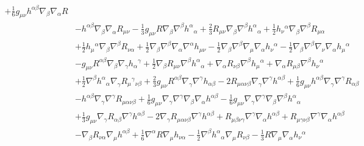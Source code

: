 \documentclass[10pt,letterpaper]{article}
\begin{document}
\begin{align}
 + \tfrac{1}{6} g_{\mu \nu} h^{\alpha \beta} \nabla_{\beta}\nabla_{\alpha}R\nonumber\\
& -  h^{\alpha \beta} \nabla_{\beta}\nabla_{\alpha}R_{\mu \nu}
 -  \tfrac{1}{3} g_{\mu \nu} R \nabla_{\beta}\nabla^{\beta}h^{\alpha}{}_{\alpha}
 + \tfrac{2}{3} R_{\mu \nu} \nabla_{\beta}\nabla^{\beta}h^{\alpha}{}_{\alpha}
 + \tfrac{1}{2} h_{\nu}{}^{\alpha} \nabla_{\beta}\nabla^{\beta}R_{\mu \alpha}\nonumber\\
& + \tfrac{1}{2} h_{\mu}{}^{\alpha} \nabla_{\beta}\nabla^{\beta}R_{\nu \alpha}
 + \tfrac{1}{2} \nabla_{\beta}\nabla^{\beta}\nabla_{\alpha}\nabla^{\alpha}h_{\mu \nu}
 -  \tfrac{1}{2} \nabla_{\beta}\nabla^{\beta}\nabla_{\mu}\nabla_{\alpha}h_{\nu}{}^{\alpha}
 -  \tfrac{1}{2} \nabla_{\beta}\nabla^{\beta}\nabla_{\nu}\nabla_{\alpha}h_{\mu}{}^{\alpha}\nonumber\\
& -  g_{\mu \nu} R^{\alpha \beta} \nabla_{\beta}\nabla_{\gamma}h_{\alpha}{}^{\gamma}
 + \tfrac{1}{2} \nabla_{\beta}R_{\mu \nu} \nabla^{\beta}h^{\alpha}{}_{\alpha}
 + \nabla_{\alpha}R_{\nu \beta} \nabla^{\beta}h_{\mu}{}^{\alpha}
 + \nabla_{\alpha}R_{\mu \beta} \nabla^{\beta}h_{\nu}{}^{\alpha}\nonumber\\
& + \tfrac{1}{2} \nabla^{\beta}h^{\alpha}{}_{\alpha} \nabla_{\gamma}R_{\mu}{}^{\gamma}{}_{\nu \beta}
 + \tfrac{2}{3} g_{\mu \nu} R^{\alpha \beta} \nabla_{\gamma}\nabla^{\gamma}h_{\alpha \beta}
 - 2 R_{\mu \alpha \nu \beta} \nabla_{\gamma}\nabla^{\gamma}h^{\alpha \beta}
 + \tfrac{1}{6} g_{\mu \nu} h^{\alpha \beta} \nabla_{\gamma}\nabla^{\gamma}R_{\alpha \beta}\nonumber\\
& -  h^{\alpha \beta} \nabla_{\gamma}\nabla^{\gamma}R_{\mu \alpha \nu \beta}
 + \tfrac{1}{6} g_{\mu \nu} \nabla_{\gamma}\nabla^{\gamma}\nabla_{\beta}\nabla_{\alpha}h^{\alpha \beta}
 -  \tfrac{1}{6} g_{\mu \nu} \nabla_{\gamma}\nabla^{\gamma}\nabla_{\beta}\nabla^{\beta}h^{\alpha}{}_{\alpha}\nonumber\\
& + \tfrac{1}{3} g_{\mu \nu} \nabla_{\gamma}R_{\alpha \beta} \nabla^{\gamma}h^{\alpha \beta}
 - 2 \nabla_{\gamma}R_{\mu \alpha \nu \beta} \nabla^{\gamma}h^{\alpha \beta}
 + R_{\mu \beta \nu \gamma} \nabla^{\gamma}\nabla_{\alpha}h^{\alpha \beta}
 + R_{\mu \gamma \nu \beta} \nabla^{\gamma}\nabla_{\alpha}h^{\alpha \beta}\nonumber\\
& -  \nabla_{\beta}R_{\nu \alpha} \nabla_{\mu}h^{\alpha \beta}
 + \tfrac{1}{6} \nabla^{\alpha}R \nabla_{\mu}h_{\nu \alpha}
 -  \tfrac{1}{2} \nabla^{\beta}h^{\alpha}{}_{\alpha} \nabla_{\mu}R_{\nu \beta}
 -  \tfrac{1}{3} R \nabla_{\mu}\nabla_{\alpha}h_{\nu}{}^{\alpha}\nonumber\\

\end{align}
\end{document}
